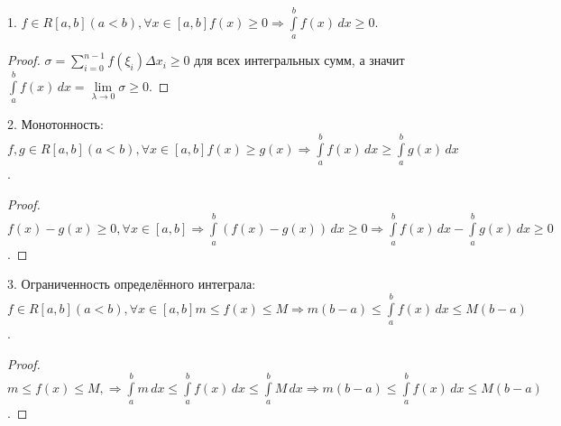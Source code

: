 \begin{prop}
1. $ f \in R[a,b] (a < b), \forall x \in [a,b] f(x) \geqslant 0 \Rightarrow \int\limits_a^b f(x) \, dx \geqslant 0 $.
\begin{proof}
    $\sigma = \sum\limits_{i=0}^{n-1} f(\xi_i) \Delta x_i \geqslant 0$ для всех интегральных сумм, а значит $ \int\limits_a^b f(x) \, dx = \lim\limits_{\lambda \to 0} \sigma \geqslant 0 $.
\end{proof}
2. Монотонность: $ f, g \in R[a,b] (a < b), \forall x \in [a,b] f(x) \geqslant g(x) \Rightarrow \int\limits_a^b f(x) \, dx \geqslant \int\limits_a^b g(x) \, dx $.
\begin{proof}
    $ f(x) - g(x) \geqslant 0, \forall x \in [a,b] \Rightarrow \int\limits_a^b (f(x) - g(x)) \, dx \geqslant 0 \Rightarrow \int\limits_a^b f(x) \, dx - \int\limits_a^b g(x) \, dx \geqslant 0 $.
\end{proof}
3. Ограниченность определённого интеграла: $ f \in R[a,b] (a < b), \forall x \in [a,b] m \leqslant f(x) \leqslant M \Rightarrow m(b-a) \leqslant \int\limits_a^b f(x) \, dx \leqslant M(b-a) $.
\begin{proof}
    $ m \leqslant f(x) \leqslant M, \Rightarrow \int\limits_a^b m \, dx \leqslant \int\limits_a^b f(x) \, dx \leqslant \int\limits_a^b M \, dx \Rightarrow m(b-a) \leqslant \int\limits_a^b f(x) \, dx \leqslant M(b-a) $.
\end{proof}
\end{prop}


